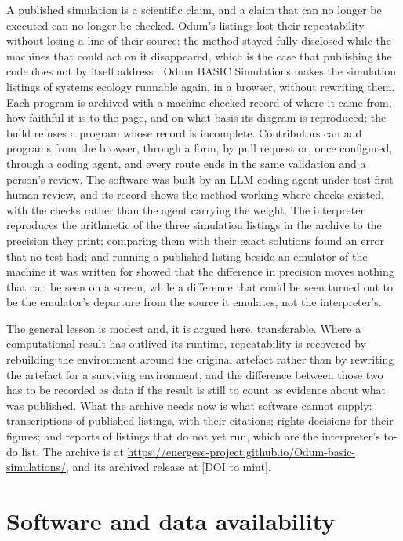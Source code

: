 A published simulation is a scientific claim, and a claim that can no longer be executed can no longer be checked. Odum's listings lost their repeatability without losing a line of their source: the method stayed fully disclosed while the machines that could act on it disappeared, which is the case that publishing the code does not by itself address \citep{ince2012,parnas1994}. Odum BASIC Simulations makes the simulation listings of systems ecology runnable again, in a browser, without rewriting them. Each program is archived with a machine-checked record of where it came from, how faithful it is to the page, and on what basis its diagram is reproduced; the build refuses a program whose record is incomplete. Contributors can add programs from the browser, through a form, by pull request or, once configured, through a coding agent, and every route ends in the same validation and a person's review. The software was built by an LLM coding agent under test-first human review, and its record shows the method working where checks existed, with the checks rather than the agent carrying the weight. The interpreter reproduces the arithmetic of the three simulation listings in the archive to the precision they print; comparing them with their exact solutions found an error that no test had; and running a published listing beside an emulator of the machine it was written for showed that the difference in precision moves nothing that can be seen on a screen, while a difference that could be seen turned out to be the emulator's departure from the source it emulates, not the interpreter's.

The general lesson is modest and, it is argued here, transferable. Where a computational result has outlived its runtime, repeatability is recovered by rebuilding the environment around the original artefact rather than by rewriting the artefact for a surviving environment, and the difference between those two has to be recorded as data if the result is still to count as evidence about what was published. What the archive needs now is what software cannot supply: transcriptions of published listings, with their citations; rights decisions for their figures; and reports of listings that do not yet run, which are the interpreter's to-do list. The archive is at \url{https://energese-project.github.io/Odum-basic-simulations/}, and its archived release at [DOI to mint].

\section*{Software and data availability}

